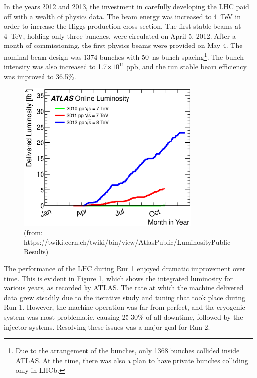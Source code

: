 In the years 2012 and 2013, the investment in carefully developing the LHC paid off with a wealth of physics data.
The beam energy was increased to 4~TeV in order to increase the Higgs production cross-section.
The first stable beams at 4~TeV, holding only three bunches, were circulated on April 5, 2012.
After a month of commissioning, the first physics beams were provided on May 4.
The nominal beam design was 1374 bunches with 50~ns bunch spacing\footnote{Due to the arrangement of the bunches, only 1368 bunches collided inside ATLAS. At the time, there was also a plan to have private bunches colliding only in LHCb.}.
The bunch intensity was also increased to 1.7$\times10^{11}$ ppb, and the run stable beam efficiency was improved to 36.5\%.

\begin{figure}[h!]
\captionsetup[subfigure]{position=b}
\centering
\includegraphics[width=0.8\textwidth]{figures/experiment/lhc/run1Lumi.eps}
\caption{ (from: https://twiki.cern.ch/twiki/bin/view/AtlasPublic/LuminosityPublicResults)}
\label{fig:run1Lumi}
\end{figure}

The performance of the LHC during Run 1 enjoyed dramatic improvement over time.
This is evident in Figure \ref{fig:run1Lumi}, which shows the integrated luminosity for various years, as recorded by ATLAS.
The rate at which the machine delivered data grew steadily due to the iterative study and tuning that took place during Run 1.
However, the machine operation was far from perfect, and the cryogenic system was most problematic, causing 25-30\% of all downtime, followed by the injector systems.
Resolving these issues was a major goal for Run 2. \cite{lhcRun1}

